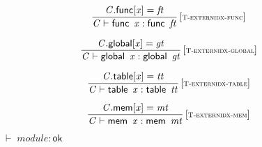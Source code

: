 $$
\begin{array}{@{}c@{}}\displaystyle
\frac{
{\mathit{C}}.\mathsf{func}{}[{\mathit{x}}] = {\mathit{ft}}
}{
{\mathit{C}} \vdash \mathsf{func}~\,{\mathit{x}} : \mathsf{func}~\,{\mathit{ft}}
} \, {[\textsc{\scriptsize T{-}externidx{-}func}]}
\qquad
\end{array}
$$

$$
\begin{array}{@{}c@{}}\displaystyle
\frac{
{\mathit{C}}.\mathsf{global}{}[{\mathit{x}}] = {\mathit{gt}}
}{
{\mathit{C}} \vdash \mathsf{global}~\,{\mathit{x}} : \mathsf{global}~\,{\mathit{gt}}
} \, {[\textsc{\scriptsize T{-}externidx{-}global}]}
\qquad
\end{array}
$$

$$
\begin{array}{@{}c@{}}\displaystyle
\frac{
{\mathit{C}}.\mathsf{table}{}[{\mathit{x}}] = {\mathit{tt}}
}{
{\mathit{C}} \vdash \mathsf{table}~\,{\mathit{x}} : \mathsf{table}~\,{\mathit{tt}}
} \, {[\textsc{\scriptsize T{-}externidx{-}table}]}
\qquad
\end{array}
$$

$$
\begin{array}{@{}c@{}}\displaystyle
\frac{
{\mathit{C}}.\mathsf{mem}{}[{\mathit{x}}] = {\mathit{mt}}
}{
{\mathit{C}} \vdash \mathsf{mem}~\,{\mathit{x}} : \mathsf{mem}~\,{\mathit{mt}}
} \, {[\textsc{\scriptsize T{-}externidx{-}mem}]}
\qquad
\end{array}
$$

\vspace{1ex}

$\boxed{{ \vdash }\;{\mathit{module}} : \mathsf{ok}}$

